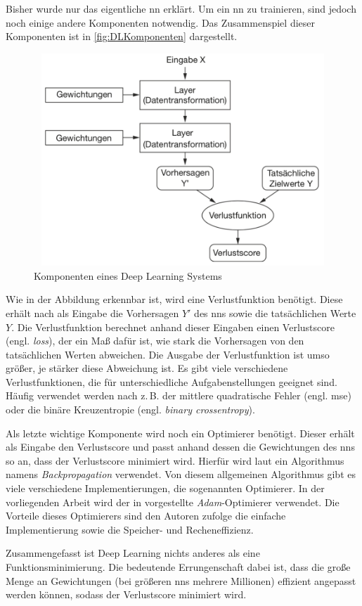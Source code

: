Bisher wurde nur das eigentliche \acrshort{nn} erklärt.
Um ein \acrshort{nn} zu trainieren, sind jedoch noch einige andere Komponenten notwendig.
Das Zusammenspiel dieser Komponenten ist in \autoref{fig:DLKomponenten} dargestellt.
\begin{figure}[h]
    \centering
    \includegraphics[width=1\textwidth,height=8cm,keepaspectratio=true]{content/images/DeepLearningKomponenten.png}
    \caption{Komponenten eines Deep Learning Systems \cite[Abb. 1.9]{DeepLearningPythonKeras}}
    \label{fig:DLKomponenten}
\end{figure}
Wie in der Abbildung erkennbar ist, wird eine Verlustfunktion benötigt.
Diese erhält nach \cite[S. 30]{DeepLearningPythonKeras} als Eingabe die Vorhersagen $Y'$ des \acrshort{nn}s sowie die tatsächlichen Werte $Y$.
Die Verlustfunktion berechnet anhand dieser Eingaben einen Verlustscore (engl. \emph{loss}), der ein Maß dafür ist, wie stark die Vorhersagen von den tatsächlichen Werten abweichen.
Die Ausgabe der Verlustfunktion ist umso größer, je stärker diese Abweichung ist.
Es gibt viele verschiedene Verlustfunktionen, die für unterschiedliche Aufgabenstellungen geeignet sind.
Häufig verwendet werden nach \cite[S. 155]{DeepLearningPythonKeras} z.\,B. der mittlere quadratische Fehler (engl. \acrfull{mse}) oder die binäre Kreuzentropie (engl. \emph{binary crossentropy}).

Als letzte wichtige Komponente wird noch ein Optimierer benötigt.
Dieser erhält als Eingabe den Verlustscore und passt anhand dessen die Gewichtungen des \acrshort{nn}s so an, dass der Verlustscore minimiert wird.
Hierfür wird laut \cite[S. 30]{DeepLearningPythonKeras} ein Algorithmus namens \emph{Backpropagation} verwendet.
Von diesem allgemeinen Algorithmus gibt es viele verschiedene Implementierungen, die sogenannten Optimierer.
In der vorliegenden Arbeit wird der in \cite{AdamPaper} vorgestellte \emph{Adam}-Optimierer verwendet.
Die Vorteile dieses Optimierers sind den Autoren zufolge die einfache Implementierung sowie die Speicher- und Recheneffizienz.

Zusammengefasst ist Deep Learning nichts anderes als eine Funktionsminimierung.
Die bedeutende Errungenschaft dabei ist, dass die große Menge an Gewichtungen (bei größeren \acrshort{nn}s mehrere Millionen) effizient angepasst werden können, sodass der Verlustscore minimiert wird.

